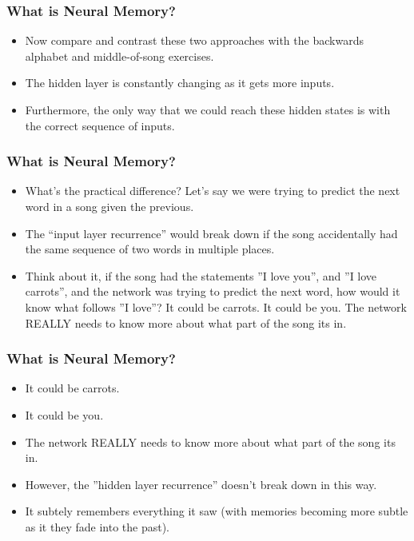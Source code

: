 \begin{frame}[fragile] \frametitle{What is Neural Memory?}
\begin{itemize}
\item  Now compare and contrast these two approaches with the backwards alphabet and middle-of-song exercises. 
\item The hidden layer is constantly changing as it gets more inputs. 
\item Furthermore, the only way that we could reach these hidden states is with the correct sequence of inputs.
\end{itemize}
\end{frame}



\begin{frame}[fragile] \frametitle{What is Neural Memory?}
\begin{itemize}
\item  What's the practical difference? Let's say we were trying to predict the next word in a song given the previous. 
\item The ``input layer recurrence'' would break down if the song accidentally had the same sequence of two words in multiple places. 
\item Think about it, if the song had the statements ''I love you'', and ''I love carrots'', and the network was trying to predict the next word, how would it know what follows ''I love''? 
It could be carrots. It could be you. The network REALLY needs to know more about what part of the song its in.
\end{itemize}
\end{frame}


\begin{frame}[fragile] \frametitle{What is Neural Memory?}
\begin{itemize}
\item  It could be carrots. 
\item It could be you. 
\item The network REALLY needs to know more about what part of the song its in.
\item However, the ''hidden layer recurrence'' doesn't break down in this way. 
\item It subtely remembers everything it saw (with memories becoming more subtle as it they fade into the past).
\end{itemize}
\end{frame}


